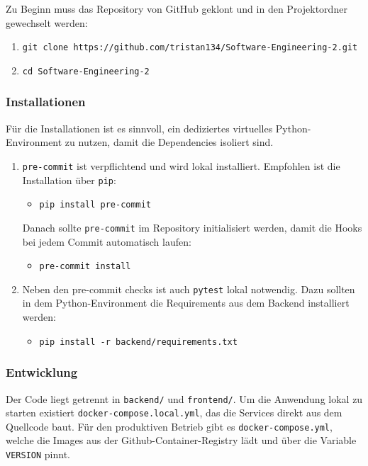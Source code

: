 \documentclass[12pt,a4paper]{article}
\begin{document}
        Zu Beginn muss das Repository von GitHub geklont und in den Projektordner gewechselt werden:
        \begin{enumerate}
            \item \texttt{git clone https://github.com/tristan134/Software-Engineering-2.git}
            \item \texttt{cd Software-Engineering-2}
        \end{enumerate}

    \subsubsection{Installationen}
        Für die Installationen ist es sinnvoll, ein dediziertes virtuelles Python-Environment zu nutzen, damit die Dependencies isoliert sind.

    \begin{enumerate}
        \item \texttt{pre-commit} ist verpflichtend und wird lokal installiert. Empfohlen ist die Installation über \texttt{pip}:
            \begin{itemize}[leftmargin=*]
                \item \texttt{pip install pre-commit}
            \end{itemize}
            Danach sollte \texttt{pre-commit} im Repository initialisiert werden, damit die Hooks bei jedem Commit automatisch
            laufen:
            \begin{itemize}[leftmargin=*]
                \item \texttt{pre-commit install}
            \end{itemize}
        \item Neben den pre-commit checks ist auch \texttt{pytest} lokal notwendig. Dazu sollten in dem Python-Environment die Requirements aus dem Backend installiert werden:
                \begin{itemize}[leftmargin=*]
                    \item \texttt{pip install -r backend/requirements.txt}
                \end{itemize}
    \end{enumerate}

    \subsubsection{Entwicklung}
        Der Code liegt getrennt in \texttt{backend/} und \texttt{frontend/}. Um die Anwendung lokal zu starten existiert
        \texttt{docker-compose.local.yml}, das die Services direkt aus dem Quellcode baut. Für den produktiven Betrieb gibt
        es \texttt{docker-compose.yml}, welche die Images aus der Github-Container-Registry lädt und über die Variable \texttt{VERSION} pinnt.
\end{document}
